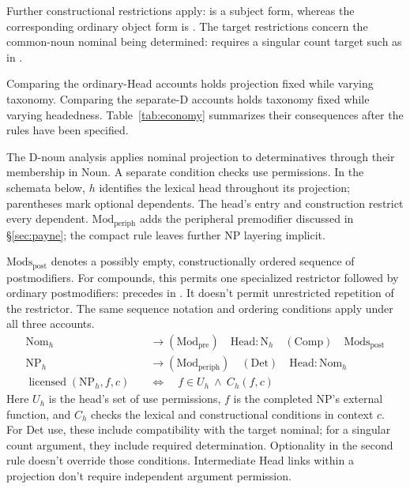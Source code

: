 \documentclass[12pt]{article}
\begin{document}
Further constructional restrictions apply:  is a subject form, whereas the corresponding ordinary object form is . The target restrictions concern the common-noun nominal being determined:  requires a singular count target such as  in .

Comparing the ordinary-Head accounts holds projection fixed while varying taxonomy. Comparing the separate-D accounts holds taxonomy fixed while varying headedness. Table~\ref{tab:economy} summarizes their consequences after the rules have been specified.

The D-noun analysis applies nominal projection to determinatives through their membership in Noun. A separate condition checks use permissions. In the schemata below, $h$ identifies the lexical head throughout its projection; parentheses mark optional dependents. The head's entry and construction restrict every dependent. $\mathrm{Mod}_{\mathrm{periph}}$ adds the peripheral premodifier discussed in §\ref{sec:payne}; the compact rule leaves further NP layering implicit.

$\mathrm{Mods}_{\mathrm{post}}$ denotes a possibly empty, constructionally ordered sequence of postmodifiers. For compounds, this permits one specialized restrictor followed by ordinary postmodifiers:  precedes  in . It doesn't permit unrestricted repetition of the restrictor. The same sequence notation and ordering conditions apply under all three accounts.
\[
\begin{aligned}
\mathrm{Nom}_{h} &\to (\mathrm{Mod}_{\mathrm{pre}})\quad \mathrm{Head}:\mathrm{N}_{h}\quad (\mathrm{Comp})\quad \mathrm{Mods}_{\mathrm{post}} \\
\mathrm{NP}_{h} &\to (\mathrm{Mod}_{\mathrm{periph}})\quad (\mathrm{Det})\quad \mathrm{Head}:\mathrm{Nom}_{h} \\
\operatorname{licensed}(\mathrm{NP}_{h},f,c)\quad &\Longleftrightarrow\quad f\in U_h\ \land\ C_h(f,c)
\end{aligned}
\]
Here $U_h$ is the head's set of use permissions, $f$ is the completed NP's external function, and $C_h$ checks the lexical and constructional conditions in context $c$. For Det use, these include compatibility with the target nominal; for a singular count argument, they include required determination. Optionality in the second rule doesn't override those conditions. Intermediate Head links within a projection don't require independent argument permission.
\end{document}
